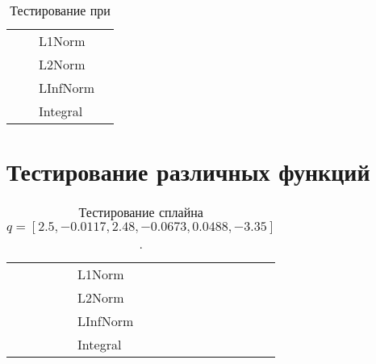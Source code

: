 \begin{table}
	\caption{Тестирование при }
	\centering
	\small
	\begin{tabularx}{1.0\textwidth}{| >{\raggedright\arraybackslash}X | >{\raggedright\arraybackslash}X | >{\raggedright\arraybackslash}X | >{\raggedright\arraybackslash}X |}
		\hline
		\centering{Входные точки}  & \centering{Функция} & \centering{Функционал} & \centering{Результат} \tabularnewline \hline    
		
		\multirow{4}{*}{\centering{(0.5; 0.5; 0.5)}} & \multirow{4}{*}{\centering{FFFFF}} & L1Norm & \centering{0.00000000E+000; 0.00000000E+000; 0.00000000E+000} \tabularnewline \cline{3-4}
		& & L2Norm & \centering{0.00000000E+000; 0.00000000E+000; 0.00000000E+000} \tabularnewline \cline{3-4}
		& & LInfNorm & \centering{0.00000000E+000; 0.00000000E+000; 0.00000000E+000} \tabularnewline \cline{3-4}
		& & Integral & \centering{0.00000000E+000; 0.00000000E+000; 0.00000000E+000} \tabularnewline \hline
	\end{tabularx}
	\label{tab:test5}
\end{table}

\section{Тестирование различных функций}

\begin{table}
	\caption{Тестирование сплайна $q = \left[2.5, -0.0117, 2.48, -0.0673, 0.0488, -3.35\right]$.}
	\centering
	\small
	\begin{tabularx}{1.0\textwidth}{| >{\raggedright\arraybackslash}X | >{\raggedright\arraybackslash}X | >{\raggedright\arraybackslash}X | >{\raggedright\arraybackslash}X |}
		\hline
		\centering{Входные точки}  & \centering{Функция} & \centering{Функционал} & \centering{Результат} \tabularnewline \hline    
		
		\multirow{4}{*}{\centering{(0.5; 0.5; 0.5)}} & \multirow{4}{*}{\centering{FFFFF}} & L1Norm & \centering{0.00000000E+000; 0.00000000E+000; 0.00000000E+000} \tabularnewline \cline{3-4}
		& & L2Norm & \centering{0.00000000E+000; 0.00000000E+000; 0.00000000E+000} \tabularnewline \cline{3-4}
		& & LInfNorm & \centering{0.00000000E+000; 0.00000000E+000; 0.00000000E+000} \tabularnewline \cline{3-4}
		& & Integral & \centering{0.00000000E+000; 0.00000000E+000; 0.00000000E+000} \tabularnewline \hline
	\end{tabularx}
	\label{tab:test6}
\end{table}

